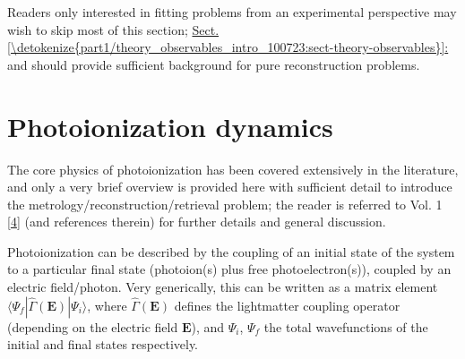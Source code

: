 \documentclass[letterpaper,table,10pt,english]{jupyterBook}
\begin{document}
\sphinxAtStartPar
Readers only interested in fitting problems from an experimental perspective may wish to skip most of this section; \hyperref[\detokenize{part1/theory_observables_intro_100723:sect-theory-observables}]{Sect.\@ \ref{\detokenize{part1/theory_observables_intro_100723:sect-theory-observables}}:} and  should provide sufficient background for pure reconstruction problems.

\sphinxstepscope


\section{Photoionization dynamics}
\label{\detokenize{part1/theory_photoionization_dynamics_140723:photoionization-dynamics}}\label{\detokenize{part1/theory_photoionization_dynamics_140723:sec-dynamics-intro}}\label{\detokenize{part1/theory_photoionization_dynamics_140723::doc}}
\sphinxAtStartPar
The core physics of photoionization has been covered extensively in the literature, and only a very brief overview is provided here with sufficient detail to introduce the metrology/reconstruction/retrieval problem; the reader is referred to  Vol. 1 {[}\hyperlink{cite.backmatter/bibliography:id675}{4}{]} (and references therein) for further details and general discussion.

\sphinxAtStartPar
Photoionization can be described by the coupling of an initial state of the system to a particular final state (photoion(s) plus free photoelectron(s)), coupled by an electric field/photon. Very generically, this can be written as a matrix element \(\langle\Psi_f|\hat{\Gamma}(\boldsymbol{\mathbf{E}})|\Psi_i\rangle\), where \(\hat{\Gamma}(\boldsymbol{\mathbf{E}})\) defines the light\sphinxhyphen{}matter coupling operator (depending on the electric field \(\boldsymbol{\mathbf{E}}\)), and \(\Psi_i\), \(\Psi_f\) the total wavefunctions of the initial and final states respectively.
\end{document}
